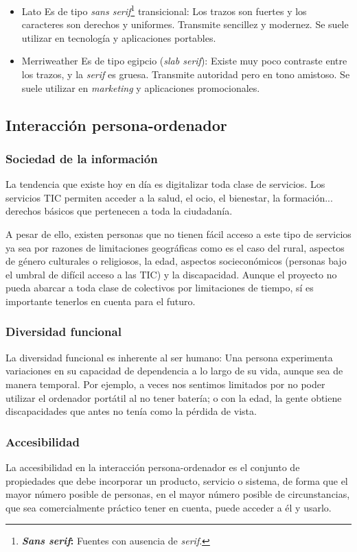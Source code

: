 \begin{itemize}
\item Lato
Es de tipo \textit{sans serif}\footnote{\textbf{\textit{Sans serif}:} Fuentes con ausencia de \textit{serif}.} transicional: Los trazos son fuertes y los caracteres son derechos y uniformes. Transmite sencillez y modernez. Se suele utilizar en tecnología y aplicaciones portables.
\item Merriweather
Es de tipo egipcio (\textit{slab serif}): Existe muy poco contraste entre los trazos, y la \textit{serif} es gruesa. Transmite autoridad pero en tono amistoso. Se suele utilizar en \textit{marketing} y aplicaciones promocionales.
\end{itemize}


\subsection{Interacción persona-ordenador}
\subsubsection{Sociedad de la información}
La tendencia que existe hoy en día es digitalizar toda clase de servicios. Los servicios TIC permiten acceder a la salud, el ocio, el bienestar, la formación... derechos básicos que pertenecen a toda la ciudadanía.


A pesar de ello, existen personas que no tienen fácil acceso a este tipo de servicios ya sea por razones de limitaciones geográficas como es el caso del rural, aspectos de género culturales o religiosos, la edad, aspectos socieconómicos (personas bajo el umbral de difícil acceso a las TIC) y la discapacidad.
Aunque el proyecto no pueda abarcar a toda clase de colectivos por limitaciones de tiempo, sí es importante tenerlos en cuenta para el futuro.


\subsubsection{Diversidad funcional} 
La diversidad funcional es inherente al ser humano: Una persona experimenta variaciones en su capacidad de dependencia a lo largo de su vida, aunque sea de manera temporal. Por ejemplo, a veces nos sentimos limitados por no poder utilizar el ordenador portátil al no tener batería; o con la edad, la gente obtiene discapacidades que antes no tenía como la pérdida de vista.


\subsubsection{Accesibilidad}
La accesibilidad en la interacción persona-ordenador es el conjunto de propiedades que debe incorporar un producto, servicio o sistema, de forma que el mayor número posible de personas, en el mayor número posible de circunstancias, que sea comercialmente práctico tener en cuenta, puede acceder a él y usarlo.\cite{nordic_guidelines}


